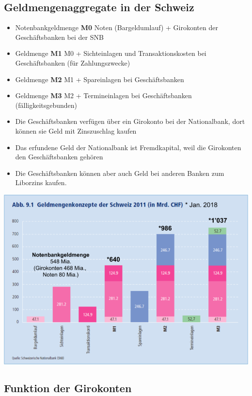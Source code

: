 \subsection{Geldmengenaggregate in der Schweiz}
\begin{multicols}{2}
	\begin{itemize}
		\item Notenbankgeldmenge \textbf{M0}
		\subitem Noten (Bargeldumlauf) + Girokonten der Geschäftsbanken bei der SNB
		\item Geldmenge \textbf{M1}
		\subitem M0 + Sichteinlagen und Transaktionskosten bei Geschäftsbanken (für Zahlungszwecke)
		\item Geldmenge \textbf{M2}
		\subitem M1 + Spareinlagen bei Geschäftsbanken
		\item Geldmenge \textbf{M3}
		\subitem M2 + Termineinlagen bei Geschäftsbanken (fälligkeitsgebunden)
		\item Die Geschäftsbanken verfügen über ein Girokonto bei der Nationalbank, dort können sie Geld mit Zinszuschlag kaufen
		\item Das erfundene Geld der Nationalbank ist Fremdkapital, weil die Girokonten den Geschäftsbanken gehören
		\item Die Geschäftsbanken können aber auch Geld bei anderen Banken zum Liborzins kaufen.
	\end{itemize}
	\vfill\null
	\columnbreak
	\includegraphics[width=\linewidth]{images/geldmengen.png}
\end{multicols}

\subsection{Funktion der Girokonten}

